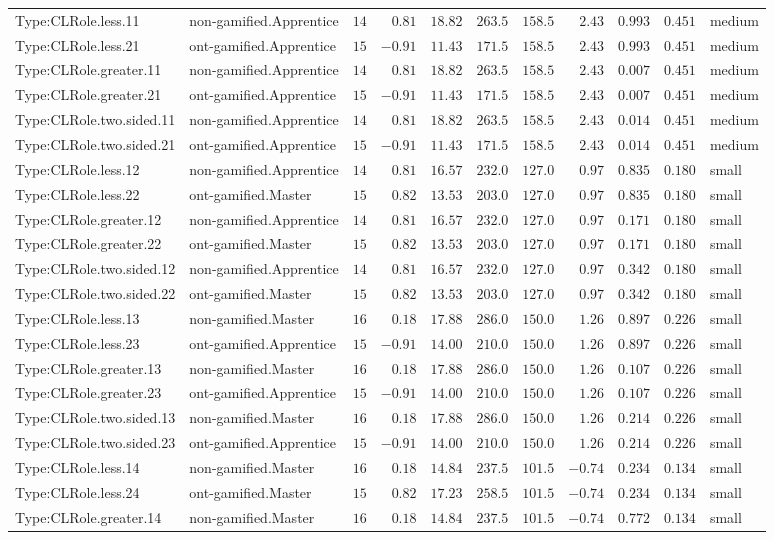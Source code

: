 \documentclass[6pt,a4paper]{article}
\begin{document}
{\begin{longtable}{llrrrrrrrrl}
Type:CLRole.less.11&non-gamified.Apprentice&$14$&$ 0.81$&$18.82$&$ 263.5$&$158.5$&$ 2.43$&$0.993$&$0.451$&medium\tabularnewline
Type:CLRole.less.21&ont-gamified.Apprentice&$15$&$-0.91$&$11.43$&$ 171.5$&$158.5$&$ 2.43$&$0.993$&$0.451$&medium\tabularnewline
Type:CLRole.greater.11&non-gamified.Apprentice&$14$&$ 0.81$&$18.82$&$ 263.5$&$158.5$&$ 2.43$&$0.007$&$0.451$&medium\tabularnewline
Type:CLRole.greater.21&ont-gamified.Apprentice&$15$&$-0.91$&$11.43$&$ 171.5$&$158.5$&$ 2.43$&$0.007$&$0.451$&medium\tabularnewline
Type:CLRole.two.sided.11&non-gamified.Apprentice&$14$&$ 0.81$&$18.82$&$ 263.5$&$158.5$&$ 2.43$&$0.014$&$0.451$&medium\tabularnewline
Type:CLRole.two.sided.21&ont-gamified.Apprentice&$15$&$-0.91$&$11.43$&$ 171.5$&$158.5$&$ 2.43$&$0.014$&$0.451$&medium\tabularnewline
Type:CLRole.less.12&non-gamified.Apprentice&$14$&$ 0.81$&$16.57$&$ 232.0$&$127.0$&$ 0.97$&$0.835$&$0.180$&small\tabularnewline
Type:CLRole.less.22&ont-gamified.Master&$15$&$ 0.82$&$13.53$&$ 203.0$&$127.0$&$ 0.97$&$0.835$&$0.180$&small\tabularnewline
Type:CLRole.greater.12&non-gamified.Apprentice&$14$&$ 0.81$&$16.57$&$ 232.0$&$127.0$&$ 0.97$&$0.171$&$0.180$&small\tabularnewline
Type:CLRole.greater.22&ont-gamified.Master&$15$&$ 0.82$&$13.53$&$ 203.0$&$127.0$&$ 0.97$&$0.171$&$0.180$&small\tabularnewline
Type:CLRole.two.sided.12&non-gamified.Apprentice&$14$&$ 0.81$&$16.57$&$ 232.0$&$127.0$&$ 0.97$&$0.342$&$0.180$&small\tabularnewline
Type:CLRole.two.sided.22&ont-gamified.Master&$15$&$ 0.82$&$13.53$&$ 203.0$&$127.0$&$ 0.97$&$0.342$&$0.180$&small\tabularnewline
Type:CLRole.less.13&non-gamified.Master&$16$&$ 0.18$&$17.88$&$ 286.0$&$150.0$&$ 1.26$&$0.897$&$0.226$&small\tabularnewline
Type:CLRole.less.23&ont-gamified.Apprentice&$15$&$-0.91$&$14.00$&$ 210.0$&$150.0$&$ 1.26$&$0.897$&$0.226$&small\tabularnewline
Type:CLRole.greater.13&non-gamified.Master&$16$&$ 0.18$&$17.88$&$ 286.0$&$150.0$&$ 1.26$&$0.107$&$0.226$&small\tabularnewline
Type:CLRole.greater.23&ont-gamified.Apprentice&$15$&$-0.91$&$14.00$&$ 210.0$&$150.0$&$ 1.26$&$0.107$&$0.226$&small\tabularnewline
Type:CLRole.two.sided.13&non-gamified.Master&$16$&$ 0.18$&$17.88$&$ 286.0$&$150.0$&$ 1.26$&$0.214$&$0.226$&small\tabularnewline
Type:CLRole.two.sided.23&ont-gamified.Apprentice&$15$&$-0.91$&$14.00$&$ 210.0$&$150.0$&$ 1.26$&$0.214$&$0.226$&small\tabularnewline
Type:CLRole.less.14&non-gamified.Master&$16$&$ 0.18$&$14.84$&$ 237.5$&$101.5$&$-0.74$&$0.234$&$0.134$&small\tabularnewline
Type:CLRole.less.24&ont-gamified.Master&$15$&$ 0.82$&$17.23$&$ 258.5$&$101.5$&$-0.74$&$0.234$&$0.134$&small\tabularnewline
Type:CLRole.greater.14&non-gamified.Master&$16$&$ 0.18$&$14.84$&$ 237.5$&$101.5$&$-0.74$&$0.772$&$0.134$&small\tabularnewline

\end{longtable}}
\end{document}
